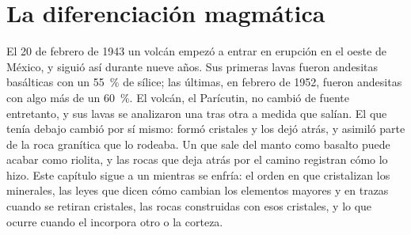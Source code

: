 \chapter{La diferenciación magmática}\label{ch:b2:magmatic-differentiation}

El 20 de febrero de 1943 un volcán empezó a entrar en erupción en el oeste de México, y siguió así
durante nueve años. Sus primeras lavas fueron andesitas basálticas con un \qty{55}{\percent}
de sílice; las últimas, en febrero de 1952, fueron andesitas con algo más de un
\qty{60}{\percent}. El volcán, el Parícutin, no cambió de fuente entretanto,
y sus lavas se analizaron una tras otra a medida que salían. El
 que tenía debajo cambió por sí mismo: formó cristales y los dejó atrás, y asimiló
parte de la roca granítica que lo rodeaba. Un  que sale del manto como basalto puede
acabar como riolita, y las rocas que deja atrás por el camino registran cómo lo hizo.
Este capítulo sigue a un  mientras se enfría: el orden en que cristalizan los minerales,
las leyes que dicen cómo cambian los elementos mayores y en trazas cuando se retiran cristales,
las rocas construidas con esos cristales, y lo que ocurre cuando el  incorpora
otro  o la corteza.

